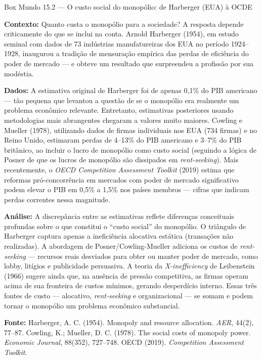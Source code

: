 \documentclass[11pt,twoside,openright]{book}
\begin{document}
\begin{boxmundobox}{Box Mundo 15.2 — O custo social do monopólio: de Harberger (EUA) à OCDE}

\textbf{Contexto:} Quanto custa o monopólio para a sociedade? A resposta
depende criticamente do que se inclui na conta. Arnold Harberger (1954),
em estudo seminal com dados de 73 indústrias manufatureiras dos EUA no
período 1924--1928, inaugurou a tradição de mensuração empírica das
perdas de eficiência do poder de mercado --- e obteve um resultado que
surpreendeu a profissão por sua modéstia.

\textbf{Dados:} A estimativa original de Harberger foi de apenas 0,1\%
do PIB americano --- tão pequena que levantou a questão de se o
monopólio era realmente um problema econômico relevante. Entretanto,
estimativas posteriores usando metodologias mais abrangentes chegaram a
valores muito maiores. Cowling e Mueller (1978), utilizando dados de
firmas individuais nos EUA (734 firmas) e no Reino Unido, estimaram
perdas de 4--13\% do PIB americano e 3--7\% do PIB britânico, ao incluir
o lucro de monopólio como custo social (seguindo a lógica de Posner de
que os lucros de monopólio são dissipados em \emph{rent-seeking}). Mais
recentemente, o \emph{OECD Competition Assessment Toolkit} (2019) estima
que reformas pró-concorrência em mercados com poder de mercado
significativo podem elevar o PIB em 0,5\% a 1,5\% nos países membros ---
cifras que indicam perdas correntes nessa magnitude.

\textbf{Análise:} A discrepância entre as estimativas reflete diferenças
conceituais profundas sobre o que constitui o ``custo social'' do
monopólio. O triângulo de Harberger captura apenas a ineficiência
alocativa estática (transações não realizadas). A abordagem de
Posner/Cowling-Mueller adiciona os custos de \emph{rent-seeking} ---
recursos reais desviados para obter ou manter poder de mercado, como
lobby, litígios e publicidade persuasiva. A teoria da
\emph{X-inefficiency} de Leibenstein (1966) sugere ainda que, na
ausência de pressão competitiva, as firmas operam acima de sua fronteira
de custos mínimos, gerando desperdício interno. Essas três fontes de
custo --- alocativo, \emph{rent-seeking} e organizacional --- se somam e
podem tornar o monopólio um problema econômico substancial.

\textbf{Fonte:} Harberger, A. C. (1954). Monopoly and resource
allocation. \emph{AER}, 44(2), 77--87. Cowling, K.; Mueller, D. C.
(1978). The social costs of monopoly power. \emph{Economic Journal},
88(352), 727--748. OECD (2019). \emph{Competition Assessment Toolkit}.

\end{boxmundobox}
\end{document}
